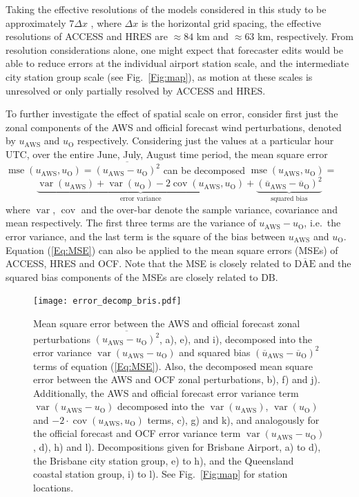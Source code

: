 \documentclass{ametsoc}
\DeclareMathOperator{\mse}{mse}
\DeclareMathOperator{\cov}{cov}
\DeclareMathOperator{\var}{var}
\begin{document}
Taking the effective resolutions of the models considered in this study to be approximately $7\Delta x$ \citep[e.g.][]{skamarock04, abdalla13}, where $\Delta x$ is the horizontal grid spacing, the effective resolutions of ACCESS and HRES are $\approx 84$ km and $\approx 63$ km, respectively. From resolution considerations alone, one might expect that forecaster edits would be able to reduce errors at the individual airport station scale, and the intermediate city station group scale (see Fig.~\ref{Fig:map}), as motion at these scales is unresolved or only partially resolved by ACCESS and HRES.

To further investigate the effect of spatial scale on error, consider first just the zonal components of the AWS and official forecast wind perturbations, denoted by $u_\text{AWS}$ and $u_\text{O}$ respectively. Considering just the values at a particular hour UTC, over the entire June, July, August time period, the mean square error $\mse\left(u_\text{AWS}, u_\text{O}\right) = \overline{\left(u_\text{AWS} - u_\text{O}\right)^2}$ can be decomposed $\mse\left(u_\text{AWS}, u_\text{O}\right)=$ 
\begin{equation}
\underbrace{\var\left(u_\text{AWS}\right) + \var\left(u_\text{O}\right) - 2\cov\left(u_\text{AWS}, u_\text{O}\right)}_\text{error variance} + \underbrace{\left(\overline{u}_\text{AWS} - \overline{u}_\text{O}\right)^2}_{\text{squared bias}} \label{Eq:MSE}
\end{equation}
where $\var$, $\cov$ and the over-bar denote the sample variance, covariance and mean respectively. The first three terms are the variance of $u_\text{AWS} - u_\text{O}$, i.e.~the error variance, and the last term is the square of the bias between $u_\text{AWS}$ and $u_\text{O}$. Equation (\ref{Eq:MSE}) can also be applied to the mean square errors (MSEs) of ACCESS, HRES and OCF. Note that the MSE is closely related to $\overline{\text{DAE}}$ and the squared bias components of the MSEs are closely related to $\text{DB}$. 

\begin{figure}
\centering
\texttt{[image: error\_decomp\_bris.pdf]}
\caption{Mean square error between the AWS and official forecast zonal perturbations $\overline{\left(u_\text{AWS} - u_\text{O}\right)^2}$, a), e), and i), decomposed into the error variance $\var\left(u_\text{AWS} - u_\text{O}\right)$ and squared bias $\left(\overline{u}_\text{AWS} - \overline{u}_\text{O}\right)^2$ terms of equation (\ref{Eq:MSE}). Also, the decomposed mean square error between the AWS and OCF zonal perturbations, b), f) and j). Additionally, the AWS and official forecast error variance term $\var\left(u_\text{AWS} - u_\text{O}\right)$ decomposed into the $\var\left(u_\text{AWS}\right)$, $\var\left(u_\text{O}\right)$ and  $- 2 \cdot \cov\left(u_\text{AWS}, u_\text{O}\right)$ terms, c), g) and k), and analogously for the official forecast and OCF error variance term $\var\left(u_\text{AWS} - u_\text{O}\right)$, d), h) and l). Decompositions given for Brisbane Airport, a) to d), the Brisbane city station group, e) to h), and the Queensland coastal station group, i) to l). See Fig.~\ref{Fig:map} for station locations.}
\label{Fig:error_decomp_bris}
\end{figure}
\end{document}
